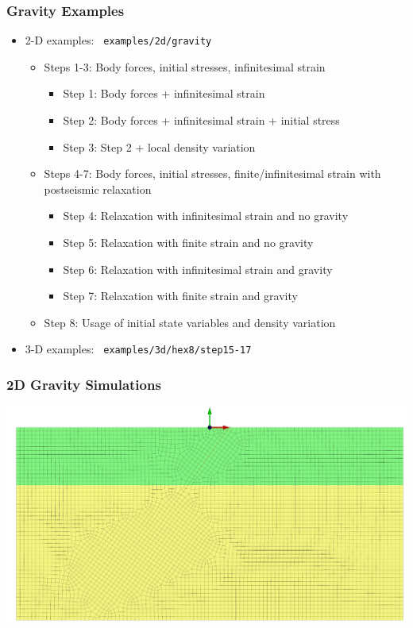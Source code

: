 \documentclass{beamer}
\begin{document}
\begin{frame}
  \frametitle{Gravity Examples}
  \summary{}

  \begin{itemize}
  \item 2-D examples: {\tt\color{red} examples/2d/gravity}
  \begin{itemize}
    \item Steps 1-3: Body forces, initial stresses, infinitesimal strain
      \begin{itemize}
      \item Step 1: Body forces + infinitesimal strain
      \item Step 2: Body forces + infinitesimal strain + initial stress
      \item Step 3: Step 2 + local density variation
      \end{itemize}
    \item Steps 4-7: Body forces, initial stresses,
      finite/infinitesimal strain with postseismic relaxation
      \begin{itemize}
      \item Step 4: Relaxation with infinitesimal strain and no gravity
      \item Step 5: Relaxation with finite strain and no gravity
      \item Step 6: Relaxation with infinitesimal strain and gravity
      \item Step 7: Relaxation with finite strain and gravity
      \end{itemize}
    \item Step 8: Usage of initial state variables and density
      variation
    \end{itemize}
  \item 3-D examples: {\tt\color{red} examples/3d/hex8/step15-17}
  \end{itemize}
  
\end{frame}


\begin{frame}
  \frametitle{2D Gravity Simulations}

  \begin{center}
    \includegraphics[scale=0.5]{figs/mesh}
  \end{center}
      
\end{frame}
\end{document}
